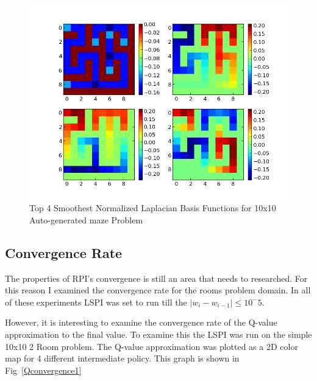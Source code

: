 \documentclass[12pt, letterpaper, final]{report}
\begin{document}
\FloatBarrier
\begin{figure}[h!]
\centering
\includegraphics[scale=.5]{images/maze01_laplacian_graph.png}
\caption{Top 4 Smoothest Normalized Laplacian Basis Functions for
  10x10 Auto-generated maze Problem}
\label{laplacianBasis3}
\end{figure}
\FloatBarrier

\subsection*{Convergence Rate}


The properties of RPI's convergence is still an area that needs to
researched. For this reason I examined the convergence rate for the
rooms problem domain. In all of these experiments
LSPI was set to run till the $|w_{i}-w_{i-1}| \le 10^-5$.

However, it is interesting to examine the convergence rate of the
Q-value approximation to the final value. To examine this the LSPI was
run on the simple 10x10 2 Room problem. The Q-value approximation was
plotted as a 2D color map for 4 different intermediate policy. This
graph is shown in Fig~\ref{Qconvergence1}
\end{document}
